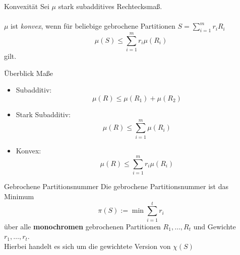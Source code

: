 \begin{frame}{}
    \begin{block}{Konvexit\"at}
        Sei $\mu$ stark subadditives Rechtecksma\ss{}.\\~\\
        \pause
        $\mu$ ist \emph{konvex}, wenn f\"ur beliebige gebrochene Partitionen $S = \sum_{i=1}^m r_i R_i$
        \[
            \mu(S) \leq \sum_{i=1}^m r_i \mu(R_i)
        \]
        gilt.
    \end{block}
\end{frame}

\begin{frame}{}
    \begin{block}{\"Uberblick Ma\ss{}e}
        \begin{itemize}
            \item Subadditiv: 
            \[
                \mu(R) \leq \mu(R_1) + \mu(R_2)
            \]
            \pause
            \item Stark Subadditiv: 
            \[
                \mu(R) \leq \sum_{i=1}^m \mu(R_i)
            \]
            \pause
            \item Konvex: \[\mu(R) \leq \sum_{i=1}^m r_i \mu(R_i)\]
        \end{itemize}
    \end{block}
\end{frame}

\begin{frame}{}
    \begin{block}{Gebrochene Partitionsnummer}
    Die gebrochene Partitionsnummer ist das Minimum
    \[
        \pi(S) := \min \sum_{i=1}^t r_i
    \]
    \"uber alle \textbf{monochromen} gebrochenen Partitionen $R_1,\dots,R_t$ und Gewichte $r_1,\dots,r_t$.\\
    \pause
    Hierbei handelt es sich um die gewichtete Version von $\chi(S)$
    \end{block}
\end{frame}

